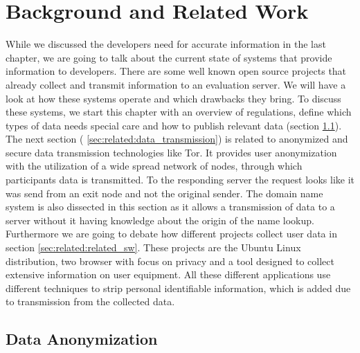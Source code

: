 \chapter{Background and Related Work}
\label{chap:related_work}
%

While we discussed the developers need for accurate information in the last chapter, we are going to talk about the current state of systems that provide information to developers. There are some well known open source projects that already collect and transmit information to an evaluation server. We will have a look at how these systems operate and which drawbacks they bring.
To discuss these systems, we start this chapter with an overview of regulations, define which types of data needs special care and how to publish relevant data (section \ref{sec:related:data_aononymization}).\\ 
The next section ( \ref{sec:related:data_transmission}) is related to anonymized and secure data transmission technologies like Tor. It provides user anonymization with the utilization of a wide spread network of nodes, through which participants data is transmitted. To the responding server the request looks like it was send from an exit node and not the original sender. The domain name system is also dissected in this section as it allows a transmission of data to a server without it having knowledge about the origin of the name lookup.
Furthermore we are going to debate how different projects collect user data in section \ref{sec:related:related_sw}. These projects are the Ubuntu Linux distribution, two browser with focus on privacy and a tool designed to collect extensive information on user equipment.
All these different applications use different techniques to strip personal identifiable information, which is added due to transmission from the collected data.

\newpage

\section{Data Anonymization}
    \label{sec:related:data_aononymization}
    
